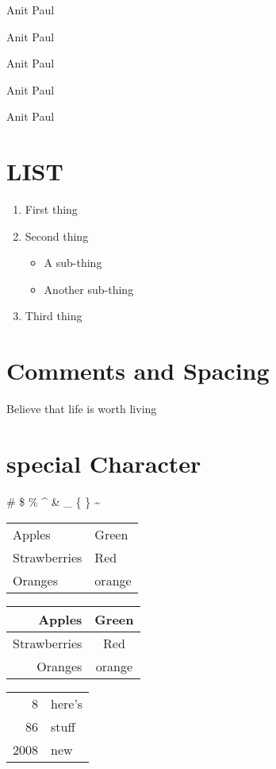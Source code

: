 \documentclass[a4paper,12pt]{report}
\begin{document}
{\small Anit Paul}

{\normalsize Anit Paul}

{\large Anit Paul}

{\LARGE Anit Paul}

{\huge Anit Paul}

\section{LIST}

\begin{enumerate}
\item First thing
\item Second thing
\begin{itemize}
\item A sub-thing
\item Another sub-thing
\end{itemize}
\item Third thing
\end{enumerate}
\section{Comments and Spacing}
Believe that life is worth living%

\section{special Character}
\# \$ \% \^{} \& \_ \{ \} \~{}

\begin{tabular}{|l|l|}
Apples & Green \\
Strawberries & Red \\
Oranges & orange \\
\end{tabular}

\begin{tabular}{rc}
Apples & Green \\
\hline
Strawberries & Red \\
\cline{1-1}
Oranges & orange \\
\end{tabular}

\begin{tabular}{|r|l|}
\hline
8 & here's \\
\cline{2-2}
86 & stuff \\
\hline \hline
2008 & new \\
\hline
\end{tabular}
\end{document}
